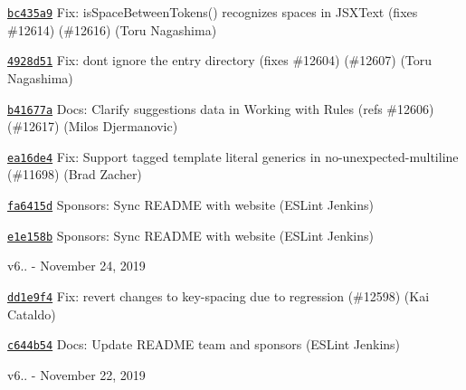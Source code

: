\begin{DoxyItemize}
\item \href{https://github.com/eslint/eslint/commit/bc435a93afd6ba4def1b53993ef7cf8220f3f070}{\texttt{ {\ttfamily bc435a9}}} Fix\+: is\+Space\+Between\+Tokens() recognizes spaces in J\+S\+X\+Text (fixes \#12614) (\#12616) (Toru Nagashima)
\item \href{https://github.com/eslint/eslint/commit/4928d513b4fe716c7ed958c294a10ef8517be25e}{\texttt{ {\ttfamily 4928d51}}} Fix\+: don\textquotesingle{}t ignore the entry directory (fixes \#12604) (\#12607) (Toru Nagashima)
\item \href{https://github.com/eslint/eslint/commit/b41677ae2a143790b19b0e70391a46ec6c8f5de1}{\texttt{ {\ttfamily b41677a}}} Docs\+: Clarify suggestion\textquotesingle{}s data in Working with Rules (refs \#12606) (\#12617) (Milos Djermanovic)
\item \href{https://github.com/eslint/eslint/commit/ea16de4e7c6f661398b0b7843f95e5f307c89551}{\texttt{ {\ttfamily ea16de4}}} Fix\+: Support tagged template literal generics in no-\/unexpected-\/multiline (\#11698) (Brad Zacher)
\item \href{https://github.com/eslint/eslint/commit/fa6415d5b877370374a6a530a5190ab5a411b4dc}{\texttt{ {\ttfamily fa6415d}}} Sponsors\+: Sync R\+E\+A\+D\+ME with website (E\+S\+Lint Jenkins)
\item \href{https://github.com/eslint/eslint/commit/e1e158b4d7bd61e812723b378d2c391295da43a5}{\texttt{ {\ttfamily e1e158b}}} Sponsors\+: Sync R\+E\+A\+D\+ME with website (E\+S\+Lint Jenkins)
\end{DoxyItemize}

v6.. -\/ November 24, 2019


\begin{DoxyItemize}
\item \href{https://github.com/eslint/eslint/commit/dd1e9f4df2103c43509a54b0ad5f9106557997f9}{\texttt{ {\ttfamily dd1e9f4}}} Fix\+: revert changes to key-\/spacing due to regression (\#12598) (Kai Cataldo)
\item \href{https://github.com/eslint/eslint/commit/c644b5429e5bc8a050afd70c99ec82035eb611fa}{\texttt{ {\ttfamily c644b54}}} Docs\+: Update R\+E\+A\+D\+ME team and sponsors (E\+S\+Lint Jenkins)
\end{DoxyItemize}

v6.. -\/ November 22, 2019


